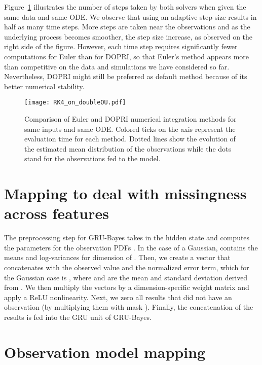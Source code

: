 \documentclass{article}
\begin{document}
Figure~\ref{fig:RK-doubleOU} illustrates the number of steps taken by both solvers when given the same data and same ODE. We observe that using an adaptive step size results in half as many time steps. More steps are taken near the observations and as the underlying process becomes smoother, the step size increase, as observed on the right side of the figure. However, each time step requires significantly fewer computations for Euler than for DOPRI, so that Euler's method appears more than competitive on the data and simulations we have considered so far. Nevertheless, DOPRI might still be preferred as default method because of its better numerical stability.

\begin{figure}[H]
\vskip 0.0in
\begin{center}
\centerline{\texttt{[image: RK4\_on\_doubleOU.pdf]}}
\caption{Comparison of Euler and DOPRI numerical integration methods for same inputs and same ODE. Colored ticks on the  axis represent the evaluation time for each method. Dotted lines show the evolution of the estimated mean distribution of the observations while the dots stand for the observations fed to the model.}
\label{fig:RK-doubleOU}
\end{center}
\vskip -0.2in
\end{figure}

\section{Mapping to deal with missingness across features}
\label{app:fprep}
The preprocessing step  for GRU-Bayes takes in the hidden state  and computes the parameters for the observation PDFs .
In the case of a Gaussian,   contains the means and log-variances for dimension  of .
Then, we create a vector  that concatenates  with  the observed value  and the normalized error term, which for the Gaussian case is , where  and  are the mean and standard deviation derived from . We then multiply the vectors  by a dimension-specific weight matrix  and apply a ReLU nonlinearity. Next, we zero all results that did not have an observation (by multiplying them with mask ). Finally, the concatenation of the results is fed into the GRU unit of GRU-Bayes.

\section{Observation model mapping}
\label{app:f_obs}
\end{document}
